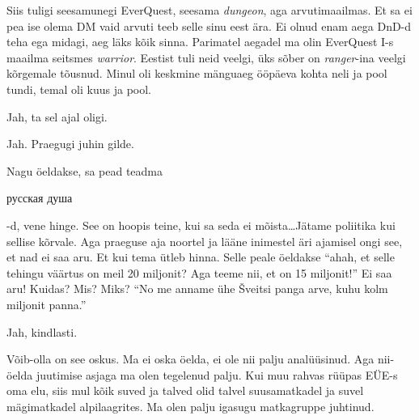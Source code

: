 Siis tuligi seesamunegi EverQuest, seesama \emph{dungeon}, aga arvutimaailmas. Et sa ei pea ise olema DM vaid arvuti teeb selle sinu eest ära. Ei olnud enam aega DnD-d teha ega midagi, aeg läks kõik sinna. Parimatel aegadel ma olin  EverQuest I-s maailma seitsmes \emph{warrior}. Eestist tuli neid veelgi, üks sõber on \emph{ranger}-ina veelgi kõrgemale tõusnud. Minul oli keskmine mänguaeg ööpäeva kohta neli ja pool tundi, temal oli kuus ja pool. 


Jah, ta sel ajal oligi.
                 

Jah. Praegugi juhin gilde. 


Nagu öeldakse, sa pead teadma \begin{russian}русская душа\end{russian}-d, vene hinge. 
See on hoopis teine, kui sa seda ei mõista\ldots Jätame poliitika kui sellise kõrvale. Aga  praeguse aja noortel ja lääne inimestel äri ajamisel ongi see, et nad ei saa aru. Et kui tema ütleb hinna. Selle peale öeldakse \enquote{ahah, et selle tehingu väärtus on meil 20 miljonit? Aga teeme nii, et on 15 miljonit!} Ei saa aru! Kuidas? Mis? Miks? \enquote{No me anname ühe Šveitsi panga arve, kuhu kolm miljonit panna.}
                 

Jah, kindlasti.


Võib-olla on see oskus. Ma ei oska öelda, ei ole nii palju analüüsinud. Aga nii-öelda juutimise asjaga ma olen tegelenud palju. Kui muu rahvas rüüpas EÜE-s oma elu, siis mul kõik suved ja talved olid talvel suusamatkadel ja suvel mägimatkadel alpilaagrites. Ma olen palju igasugu matkagruppe juhtinud.

